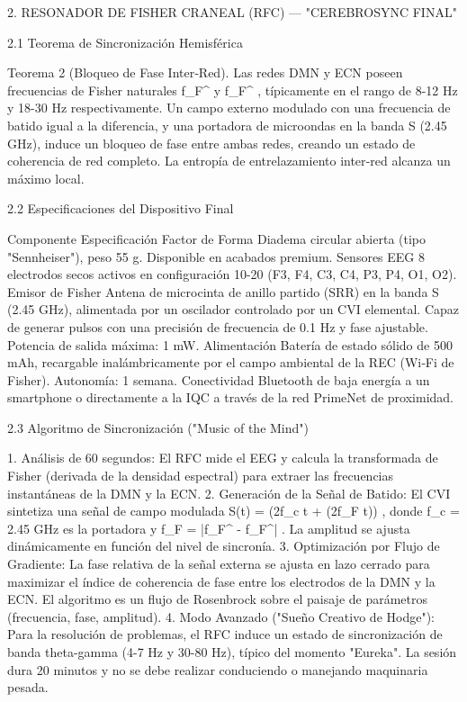 \documentclass[12pt,a4paper]{book}
\begin{document}
2. RESONADOR DE FISHER CRANEAL (RFC) — "CEREBROSYNC FINAL"

2.1 Teorema de Sincronización Hemisférica

Teorema 2 (Bloqueo de Fase Inter‑Red). Las redes DMN y ECN poseen frecuencias de Fisher naturales  f_F^{}  y  f_F^{} , típicamente en el rango de 8-12 Hz y 18-30 Hz respectivamente. Un campo externo modulado con una frecuencia de batido igual a la diferencia, y una portadora de microondas en la banda S (2.45 GHz), induce un bloqueo de fase entre ambas redes, creando un estado de coherencia de red completo. La entropía de entrelazamiento inter‑red alcanza un máximo local.

2.2 Especificaciones del Dispositivo Final

Componente Especificación
Factor de Forma Diadema circular abierta (tipo "Sennheiser"), peso 55 g. Disponible en acabados premium.
Sensores EEG 8 electrodos secos activos en configuración 10-20 (F3, F4, C3, C4, P3, P4, O1, O2).
Emisor de Fisher Antena de microcinta de anillo partido (SRR) en la banda S (2.45 GHz), alimentada por un oscilador controlado por un CVI elemental. Capaz de generar pulsos con una precisión de frecuencia de 0.1 Hz y fase ajustable. Potencia de salida máxima: 1 mW.
Alimentación Batería de estado sólido de 500 mAh, recargable inalámbricamente por el campo ambiental de la REC (Wi‑Fi de Fisher). Autonomía: 1 semana.
Conectividad Bluetooth de baja energía a un smartphone o directamente a la IQC a través de la red PrimeNet de proximidad.

2.3 Algoritmo de Sincronización ("Music of the Mind")

1. Análisis de 60 segundos: El RFC mide el EEG y calcula la transformada de Fisher (derivada de la densidad espectral) para extraer las frecuencias instantáneas de la DMN y la ECN.
2. Generación de la Señal de Batido: El CVI sintetiza una señal de campo modulada  S(t) = \cos(2\pi f_c t + \beta \sin(2\pi \Delta f_F t)) , donde  f_c = 2.45  GHz es la portadora y  \Delta f_F = |f_F^{} - f_F^{}| . La amplitud se ajusta dinámicamente en función del nivel de sincronía.
3. Optimización por Flujo de Gradiente: La fase relativa de la señal externa se ajusta en lazo cerrado para maximizar el índice de coherencia de fase entre los electrodos de la DMN y la ECN. El algoritmo es un flujo de Rosenbrock sobre el paisaje de parámetros (frecuencia, fase, amplitud).
4. Modo Avanzado ("Sueño Creativo de Hodge"): Para la resolución de problemas, el RFC induce un estado de sincronización de banda theta-gamma (4-7 Hz y 30-80 Hz), típico del momento "Eureka". La sesión dura 20 minutos y no se debe realizar conduciendo o manejando maquinaria pesada.
\end{document}
